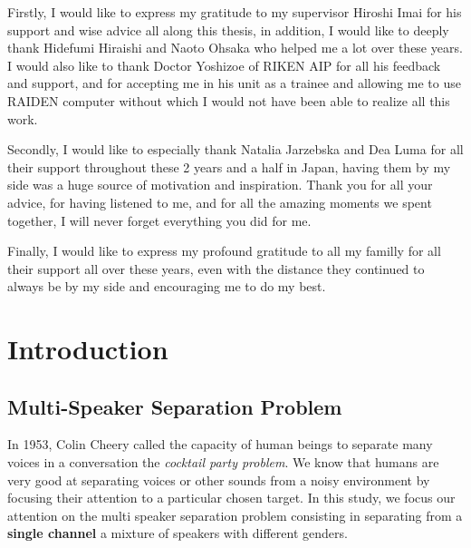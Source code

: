 \documentclass[master, tikz, final,11pt, dvipdfmx]{iscs-thesis}
\begin{document}
\maketitle

\begin{acknowledge}

Firstly, I would like to express my gratitude to my supervisor Hiroshi Imai for his support and wise advice all along this thesis, in addition, I would like to deeply thank Hidefumi Hiraishi and Naoto Ohsaka who helped me a lot over these years. I would also like to thank Doctor Yoshizoe of RIKEN AIP for all his feedback and support, and for accepting me in his unit as a trainee and allowing me to use RAIDEN computer without which I would not have been able to realize all this work.

Secondly, I would like to especially thank Natalia Jarzebska and Dea Luma for all their support throughout these 2 years and a half in Japan, having them by my side was a huge source of motivation and inspiration. Thank you for all your advice, for having listened to me, and for all the amazing moments we spent together, I will never forget everything you did for me.

Finally, I would like to express my profound gratitude to all my familly for all their support all over these years, even with the distance they continued to always be by my side and encouraging me to do my best.

\end{acknowledge}


\newpage

\tableofcontents

\newpage

\listoffigures %

\listoftables %


\chapter{Introduction}


\section{Multi-Speaker Separation Problem}
In 1953, Colin Cheery called the capacity of human beings to separate many voices in a conversation the \textit{cocktail party problem}. We know that humans are very good at separating voices or other sounds from a noisy environment by focusing their attention to a particular chosen target. In this study, we focus our attention on the multi speaker separation problem consisting in separating from a \textbf{single channel} a mixture of speakers with different genders. 
\end{document}
